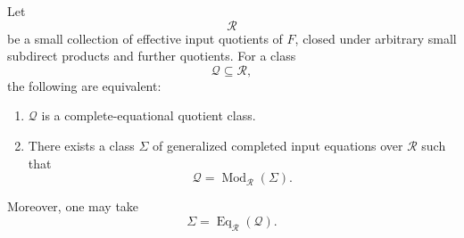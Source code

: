 \begin{theorem}
\label{thm:eilenberg-complete-equational-theorem}
Let
\[
\mathcal R
\]
be a small collection of effective input quotients of \(F\), closed under
arbitrary small subdirect products and further quotients. For a class
\[
\mathcal Q\subseteq\mathcal R,
\]
the following are equivalent:
\begin{enumerate}
\item \(\mathcal Q\) is a complete-equational quotient class.
\item There exists a class \(\Sigma\) of generalized completed input equations
over \(\mathcal R\) such that
\[
\mathcal Q=\operatorname{Mod}_{\mathcal R}(\Sigma).
\]
\end{enumerate}
Moreover, one may take
\[
\Sigma=\operatorname{Eq}_{\mathcal R}(\mathcal Q).
\]
\end{theorem}

